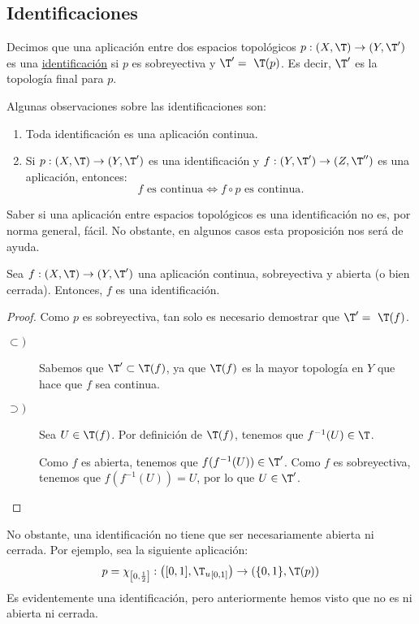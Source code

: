 \subsection{Identificaciones}
\begin{definicion}[Identificación]
    Decimos que una aplicación entre dos espacios topológicos $p:(X,\T)\to (Y,\T')$ es una \ul{identificación} si $p$ es sobreyectiva y $\T'=~\T(p)$. Es decir, $\T'$ es la topología final para $p$.
\end{definicion}

Algunas observaciones sobre las identificaciones son:
\begin{enumerate}
    \item Toda identificación es una aplicación continua.
    \item Si $p:(X,\T)\to (Y,\T')$ es una identificación y $f:(Y,\T')\to (Z,\T'')$ es una aplicación, entonces:
    \begin{equation*}
        f \text{ es continua} \Longleftrightarrow f\circ p \text{ es continua}.
    \end{equation*}
\end{enumerate}

Saber si una aplicación entre espacios topológicos es una identificación no es, por norma general, fácil. No obstante, en algunos casos esta proposición nos será de ayuda.
\begin{prop}\label{prop:ContSobrAbiertaIdentificacion}
    Sea $f:(X,\T)\to (Y,\T')$ una aplicación continua, sobreyectiva y abierta (o bien cerrada). Entonces, $f$ es una identificación.
\end{prop}
\begin{proof}
    Como $p$ es sobreyectiva, tan solo es necesario demostrar que $\T'=~\T(f)$.
    \begin{description}
        \item[$\subset)$] Sabemos que $\T'\subset \T(f)$, ya que $\T(f)$ es la mayor topología en $Y$ que hace que $f$ sea continua.
        \item[$\supset)$] Sea $U\in \T(f)$. Por definición de $\T(f)$, tenemos que $f^{-1}(U)\in \T$.
        
        Como $f$ es abierta, tenemos que $f(f^{-1}(U))\in \T'$. Como $f$ es sobreyectiva, tenemos que $f(f^{-1}(U))=U$, por lo que $U\in \T'$.
    \end{description}
\end{proof}

No obstante, una identificación no tiene que ser necesariamente abierta ni cerrada. Por ejemplo, sea la siguiente aplicación:
$$p=\chi_{\left[0,\frac{1}{2}\right]}:\left([0,1],{\T_u}_{[0,1]}\right)\to (\{0,1\}, \T(p))$$
Es evidentemente una identificación, pero anteriormente hemos visto que no es ni abierta ni cerrada.


